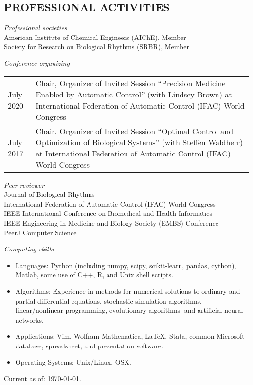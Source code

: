 \documentclass[line,10pt]{res}
\begin{document}
\begin{resume}
\section{\bf PROFESSIONAL ACTIVITIES}
\vspace{1em}
{\it Professional societies}\\[0.5em]
American Institute of Chemical Engineers (AIChE), Member\\
Society for Research on Biological Rhythms (SRBR), Member


{\it Conference organizing}\\[0.5em]
\begin{tabular}{p{0.9in} p{5.1in}}
July 2020 & Chair, Organizer of Invited Session ``Precision Medicine Enabled by Automatic Control'' (with Lindsey Brown) at International Federation of Automatic Control (IFAC) World Congress\\[0.5em]
July 2017 & Chair, Organizer of Invited Session ``Optimal Control and Optimization of Biological Systems'' (with Steffen Waldherr) at International Federation of Automatic Control (IFAC) World Congress
\end{tabular}

{\it Peer reviewer}\\[0.5em]
Journal of Biological Rhythms\\
International Federation of Automatic Control (IFAC) World Congress\\
IEEE International Conference on Biomedical and Health Informatics\\
IEEE Engineering in Medicine and Biology Society (EMBS) Conference\\
PeerJ Computer Science



{\it Computing skills}\\
\begin{itemize}
\item Languages: Python (including numpy, scipy, scikit-learn, pandas, cython), Matlab, some use of C++, R, and Unix shell scripts.
\item Algorithms: Experience in methods for numerical solutions to ordinary and partial differential equations,
      stochastic simulation algorithms, linear/nonlinear programming, evolutionary algorithms, and artificial neural networks.
\item Applications: Vim, Wolfram Mathematica, \LaTeX, Stata, common Microsoft database, spreadsheet, and presentation software.
\item Operating Systems:  Unix/Linux, OSX.\\
\end{itemize}


\end{resume}
\null\hfill Current as of: \today.
\end{document}
